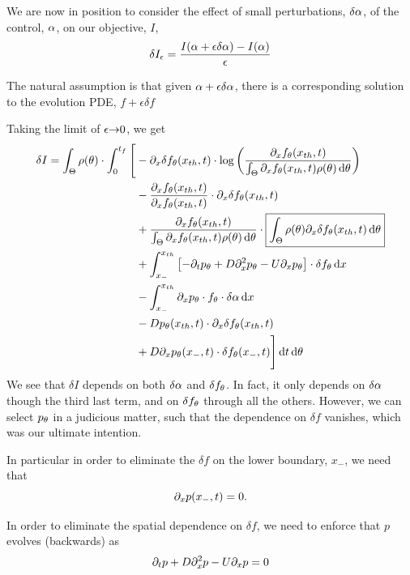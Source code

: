 \documentclass{article}
\begin{document}
We are now in position to consider the effect of small
perturbations, $\delta {\alpha}$, of the control, ${\alpha}$, on our objective, $I$,
$$
\delta I_\epsilon =\frac{I({\alpha} + \epsilon \delta {\alpha}) - I({\alpha})}{{\epsilon}}
$$

The natural assumption is that given ${\alpha} +  \epsilon \delta {\alpha}$, there is a
corresponding solution to the evolution PDE, $f+ \epsilon \delta f$

Taking the limit of $\epsilon{\rightarrow}0$, we get
\begin{equation}
\begin{aligned}
\delta I =  
\int_\Theta  \rho({\theta})\cdot \int_0^{{t_f}} \Bigg[ 
&-   {\partial}_x \delta f_{\theta}({ x_{th} }, t)  \cdot 
		\log \left( \frac{{\partial}_xf_{\theta}({ x_{th} }, t)}
						{\int_\Theta {\partial}_xf_{\theta}({ x_{th} }, t)\rho({\theta})\, \mathrm{d} {\theta} } \right)
\\ 
	&-  \frac{ {\partial}_x f_{\theta}({ x_{th} }, t)}{ {\partial}_x f_{\theta}({ x_{th} }, t)}  \cdot {\partial}_x
		\delta f_{\theta}({ x_{th} }, t)
\\ 
	&+    \frac{ {\partial}_x f_{\theta}({ x_{th} }, t)}{	{\int_\Theta {\partial}_xf_{\theta}({ x_{th} },
	t)\rho({\theta})\, \mathrm{d} {\theta} }} \cdot
		 \boxed{\int_\Theta \rho({\theta}) {\partial}_x \delta f_{\theta}({ x_{th} }, t) 	\, \mathrm{d} {\theta}}				 
\\
 &+ \int_{x_-}^{{ x_{th} }} 
	\left[-{\partial}_tp_{\theta} +  D{\partial}^2_xp_{\theta}  - U {\partial}_xp_{\theta} \right]\cdot  \delta f_{\theta}
\, \mathrm{d} x
\\ & - \int_{x_-}^{{ x_{th} }}
{\partial}_xp_{\theta} \cdot f_{\theta}\cdot \delta {\alpha} \, \mathrm{d} x
\\
 &-   D p_{\theta}({ x_{th} },t) \cdot {\partial}_x\delta f_{\theta}({ x_{th} },t) 
\\
 &+  D{\partial}_xp_{\theta}(x_-,t) \cdot\delta f_{\theta}(x_-,t)
  \Bigg]			 \, \mathrm{d} t	\, \mathrm{d} {\theta}	   
\end{aligned} 
\label{eq:differential_I_before_refactoring}
\end{equation}
We see that $\delta I$ depends on both $\delta {\alpha}$ and $\delta f_{\theta}$. 
In fact, it only depends on $\delta {\alpha}$ though the third last term, and on
$\delta f_{\theta}$ through all the others.
However, we can select $p_{\theta}$ in a judicious matter, such that the
dependence on $\delta f$ vanishes, which was our ultimate intention.

In particular in order to eliminate the $\delta f$ on the lower boundary,
$x_-$, we need that $$ {\partial}_xp(x_-,t)=0.$$

In order to eliminate the spatial dependence on $\delta f$, we need to
enforce that $p$ evolves (backwards) as $${\partial}_t p + D{\partial}_x^2p - U {\partial}_x p = 0$$
\end{document}
